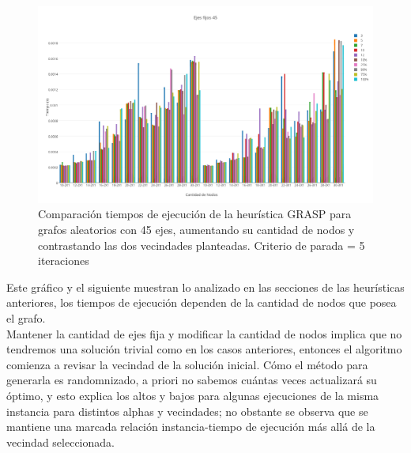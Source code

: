   \begin{figure}[h!]
   \begin{center}
 	\includegraphics[scale=0.35]{imagenes/grasp/45ejes-5repes.png}
 	\caption{Comparaci\'on tiempos de ejecuci\'on de la heur\'istica GRASP para grafos aleatorios con 45 ejes, aumentando su cantidad de nodos y contrastando las dos vecindades planteadas. Criterio de parada = 5 iteraciones}
   \end{center}
 \end{figure}
\newpage

Este gr\'afico y el siguiente muestran lo analizado en las secciones de las heur\'isticas anteriores, los tiempos de ejecuci\'on dependen de la cantidad de nodos que posea el grafo.\\

Mantener la cantidad de ejes fija y modificar la cantidad de nodos implica que no tendremos una soluci\'on trivial como en los casos anteriores, entonces el algoritmo comienza a revisar la vecindad de la soluci\'on inicial. C\'omo el m\'etodo para generarla es randomnizado, a priori no sabemos cu\'antas veces actualizar\'a su \'optimo, y esto explica los altos y bajos para algunas ejecuciones de la misma instancia para distintos alphas y vecindades; no obstante se observa que se mantiene una marcada relaci\'on instancia-tiempo de ejecuci\'on m\'as all\'a de la vecindad seleccionada.\\

